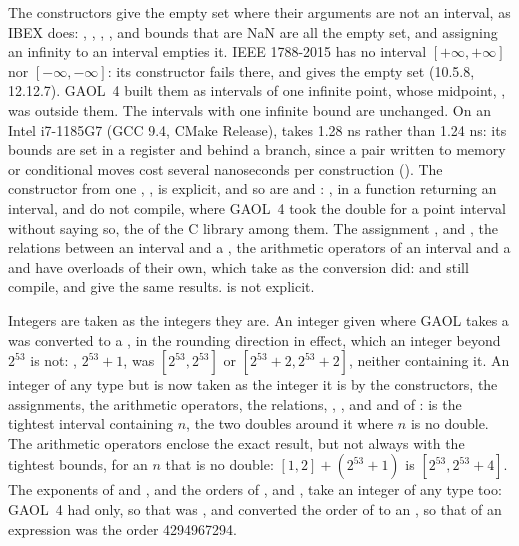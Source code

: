 \documentclass[12pt,a4paper,twoside,openright]{book}
\begin{document}
The constructors give the empty set where their arguments are not an
interval, as IBEX does: , ,
, , 
and bounds that are NaN are all the empty set, and assigning an infinity to an
interval empties it.\newinvfive{} IEEE 1788-2015 has no interval
$[+\infty, +\infty]$ nor $[-\infty, -\infty]$: its constructor fails there,
and gives the empty set (10.5.8, 12.12.7). GAOL~4 built them as intervals of
one infinite point, whose midpoint, , was outside them. The
intervals with one infinite bound are unchanged. On an Intel i7-1185G7 (GCC
9.4, CMake Release),  takes 1.28 ns rather than 1.24 ns:
its bounds are set in a register and behind a branch, since a pair written to
memory or conditional moves cost several nanoseconds per construction
(). The constructor from one ,
, is explicit, and so are 
and : ,
 in a function returning an interval, 
and  do not compile, where GAOL~4 took the
double for a point interval without saying so, the  of the C
library among them. The assignment ,  and
, the relations between an interval and a , the
arithmetic operators of an interval and a  and
 have overloads of their own, which take
 as the conversion did:  and 
still compile, and give the same results.  is
not explicit.

\medskip
Integers are taken as the integers they are.\newinvfive{} An integer given
where GAOL takes a  was converted to a , in the
rounding direction in effect, which an integer beyond $2^{53}$ is not:
, $2^{53} + 1$, was $[2^{53}, 2^{53}]$ or
$[2^{53} + 2, 2^{53} + 2]$, neither containing it. An integer of any type
but  is now taken as the integer it is by the constructors, the
assignments, the arithmetic operators, the relations, ,
, and  and  of
:  is the tightest interval
containing $n$, the two doubles around it where $n$ is no double. The
arithmetic operators enclose the exact result, but not always with the
tightest bounds, for an $n$ that is no double: $[1, 2] + (2^{53} + 1)$ is
$[2^{53}, 2^{53} + 4]$. The exponents of  and , and the
orders of ,  and , take an integer
of any type too: GAOL~4 had  only, so that
 was , and converted the
order of  to an , so that
 of an expression was the order 4294967294.
\end{document}
